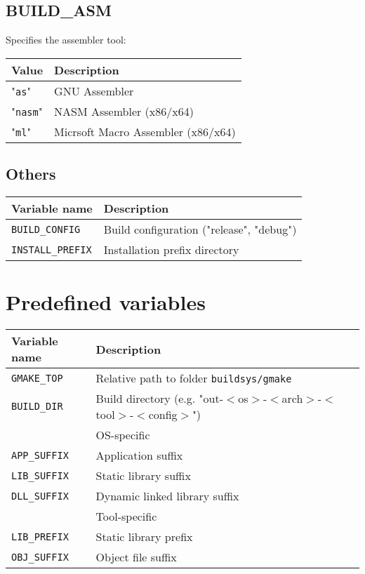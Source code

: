 \documentclass{article}
\newcommand{\var}[1]{{\tt #1}}
\newcommand{\val}[1]{"{\tt #1}"}
\newcommand{\file}[1]{{\tt #1}}
\begin{document}
\subsection{BUILD\_ASM}

Specifies the assembler tool:

\begin{tabular}{ll}
Value      & Description              \\
\hline
\val{as}   & GNU Assembler            \\
\val{nasm} & NASM Assembler (x86/x64) \\
\val{ml}   & Micrsoft Macro Assembler (x86/x64)\\
\end{tabular}

\subsection{Others}

\begin{tabular}{ll}
Variable name		& Description		\\
\hline
\var{BUILD\_CONFIG}	& Build configuration ("release", "debug") \\
\var{INSTALL\_PREFIX}	& Installation prefix directory \\
\end{tabular}

\section{Predefined variables}

\begin{tabular}{ll}
Variable name		& Description		\\
\hline
\var{GMAKE\_TOP}	& Relative path to folder \file{buildsys/gmake} \\
\var{BUILD\_DIR}	& Build directory (e.g. "out-$<$os$>$-$<$arch$>$-$<$tool$>$-$<$config$>$")\\
\hline
& OS-specific \\
\hline
\var{APP\_SUFFIX} & Application suffix            \\
\var{LIB\_SUFFIX} & Static library suffix         \\
\var{DLL\_SUFFIX} & Dynamic linked library suffix \\
\hline
& Tool-specific \\
\hline
\var{LIB\_PREFIX} & Static library prefix         \\
\var{OBJ\_SUFFIX} & Object file suffix            \\
\end{tabular}
\end{document}
